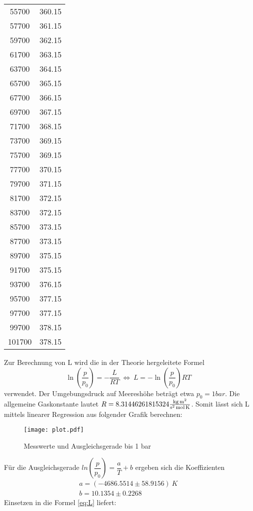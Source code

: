 \begin{table}[H]
\begin{tabular}{c c}
      55700 &   360.15 \\ 
      57700 &   361.15 \\ 
      59700 &   362.15 \\ 
      61700 &   363.15 \\ 
      63700 &   364.15 \\ 
      65700 &   365.15 \\ 
      67700 &   366.15 \\ 
      69700 &   367.15 \\ 
      71700 &   368.15 \\ 
      73700 &   369.15 \\ 
      75700 &   369.15 \\ 
      77700 &   370.15 \\ 
      79700 &   371.15 \\ 
      81700 &   372.15 \\ 
      83700 &   372.15 \\ 
      85700 &   373.15 \\ 
      87700 &   373.15 \\
      89700 &   375.15 \\ 
      91700 &   375.15 \\ 
      93700 &   376.15 \\ 
      95700 &   377.15 \\ 
      97700 &   377.15 \\ 
      99700 &   378.15 \\ 
      101700 &   378.15 \\ 
    \bottomrule
    \end{tabular}
  \end{table}

  \noindent Zur Berechnung von L wird die in der Theorie hergeleitete Formel 
  \begin{equation}
    \label{eq:L}
    \ln{(\dfrac{p}{p_0})}=-\dfrac{L}{RT}\ \Leftrightarrow \ L=-\ln{(\dfrac{p}{p_0})}RT
  \end{equation} 
  verwendet. Der Umgebungsdruck auf Meereshöhe beträgt etwa
  $p_0=1 bar$. Die allgemeine Gaskonstante lautet $R=8.31446261815324
  {\displaystyle \textstyle {\frac {\mathrm {kg\,m^{2}} }{\mathrm {s^{2}\,mol\,K} }}} $. Somit lässt 
  sich L mittels linearer Regression aus folgender Grafik berechnen: 
  \begin{figure}[H]
   \centering
   \texttt{[image: plot.pdf]}
   \caption{Messwerte und Ausgleichsgerade bis 1 bar}
   \label{fig:plot}
  \end{figure}
  \noindent Für die Ausgleichsgerade $ln(\dfrac{p}{p_0}) = \dfrac{a}{T} +b$ ergeben sich die Koeffizienten
  \begin{align*}
   a=(-4686.5514 \pm 58.9156)\ K\\
   b=10.1354 \pm 0.2268
  \end{align*}
  \noindent Einsetzen in die Formel \eqref{eq:L} liefert:

